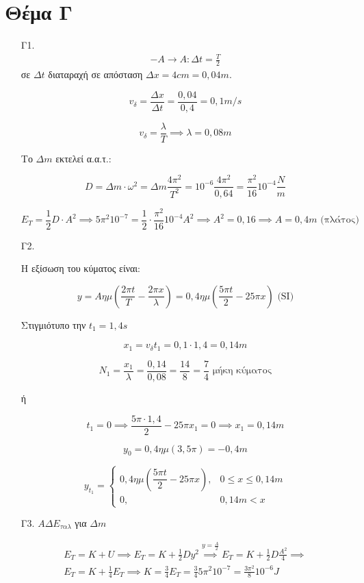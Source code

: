 \documentclass[12pt]{article}
\begin{document}
  \section*{Θέμα Γ}
  \begin{enumerate}
    \item [Γ1.]
      \begin{gather}
        -A \to A: Δt=\frac{T}{2}
      \end{gather}
      σε $Δt$ διαταραχή σε απόσταση $Δx=4cm=0,04m$.

      $$v_δ=\frac{Δx}{Δt}=\frac{0,04}{0,4}=0,1m/s$$

      $$v_δ=\frac{λ}{T}\implies λ=0,08m$$

      Το $Δm$ εκτελεί α.α.τ.:

      $$D=Δm\cdot ω^2=Δm\frac{4\pi^2}{T^2}=10^{-6}\frac{4\pi^2}{0,64}=\frac{\pi^2}{16}10^{-4}\frac{N}{m}$$

      $$E_T=\frac{1}{2}D\cdot A^2\implies 5\pi^2 10^{-7}=\frac{1}{2}\cdot\frac{\pi^2}{16}10^{-4}A^2\implies A^2=0,16\implies A=0,4m \text{ (πλάτος)}$$

    \item [Γ2.]

    Η εξίσωση του κύματος είναι:

    $$y=Aημ\left(\frac{2\pi t}{T}-\frac{2\pi x}{λ}\right)=0,4ημ\left(\frac{5\pi t}{2}-25\pi x \right) \text{ (SI)}$$

    Στιγμιότυπο την $t_1=1,4s$

    $$x_1=v_δ t_1=0,1\cdot 1,4=0,14m$$

    $$N_1=\frac{x_1}{λ}=\frac{0,14}{0,08}=\frac{14}{8}=\frac{7}{4} \text{ μήκη κύματος}$$

    ή

    $$t_1=0\implies \frac{5\pi \cdot 1,4}{2}-25\pi x_1=0\implies x_1=0,14m$$

    $$y_0=0,4ημ(3,5\pi)=-0,4m$$

    $$y_{t_1}=\begin{cases}
      0,4ημ\left(\dfrac{5\pi t}{2}-25\pi x \right), & 0\le x\le 0,14m \\
      0, & 0,14m < x
    \end{cases}$$

    \item [Γ3.]
      $ΑΔΕ_{ταλ}$ για $Δm$

      \begin{gather}
        E_T=K+U\implies E_T=K+\frac{1}{2}Dy^2 \overset{y=\frac{A}{2}}{\implies} E_T=K+\frac{1}{2}D\frac{A^2}{4}\implies \\ E_T=K+\frac{1}{4}E_T\implies K=\frac{3}{4}E_T=\frac{3}{4}5\pi^2 10^{-7}=\frac{3\pi^2}{8}10^{-6} J
      \end{gather}


\end{enumerate}
\end{document}
